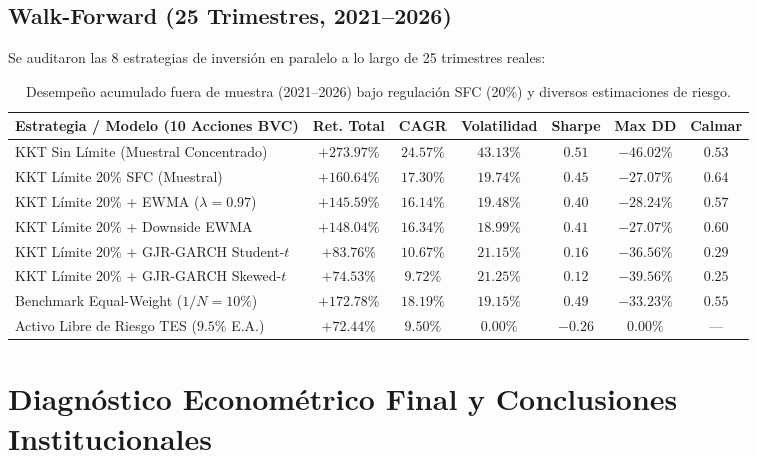 \documentclass[11pt,a4paper]{article}
\begin{document}
\subsection{Walk-Forward (25 Trimestres, 2021--2026)}
Se auditaron las 8 estrategias de inversión en paralelo a lo largo de 25 trimestres reales:

\begin{table}[htbp]
\centering
\footnotesize
\setlength{\tabcolsep}{3pt}
\begin{tabularx}{\textwidth}{Xcccccc}
\toprule
Estrategia / Modelo (10 Acciones BVC) & Ret. Total & CAGR & Volatilidad & Sharpe & Max DD & Calmar \\
\midrule
KKT Sin Límite (Muestral Concentrado) & $+273.97\%$ & $24.57\%$ & $43.13\%$ & $0.51$ & $-46.02\%$ & $0.53$ \\
KKT Límite 20\% SFC (Muestral) & $+160.64\%$ & $17.30\%$ & $19.74\%$ & $0.45$ & $-27.07\%$ & $0.64$ \\
KKT Límite 20\% + EWMA ($\lambda=0.97$) & $+145.59\%$ & $16.14\%$ & $19.48\%$ & $0.40$ & $-28.24\%$ & $0.57$ \\
KKT Límite 20\% + Downside EWMA & $+148.04\%$ & $16.34\%$ & $18.99\%$ & $0.41$ & $-27.07\%$ & $0.60$ \\
KKT Límite 20\% + GJR-GARCH Student-$t$ & $+83.76\%$ & $10.67\%$ & $21.15\%$ & $0.16$ & $-36.56\%$ & $0.29$ \\
KKT Límite 20\% + GJR-GARCH Skewed-$t$ & $+74.53\%$ & $9.72\%$ & $21.25\%$ & $0.12$ & $-39.56\%$ & $0.25$ \\
\midrule
Benchmark Equal-Weight ($1/N = 10\%$) & $+172.78\%$ & $18.19\%$ & $19.15\%$ & $0.49$ & $-33.23\%$ & $0.55$ \\
Activo Libre de Riesgo TES ($9.5\%$ E.A.) & $+72.44\%$ & $9.50\%$ & $0.00\%$ & $-0.26$ & $0.00\%$ & --- \\
\bottomrule
\end{tabularx}
\caption{Desempeño acumulado fuera de muestra (2021--2026) bajo regulación SFC (20\%) y diversos estimaciones de riesgo.}
\end{table}

\section{Diagnóstico Econométrico Final y Conclusiones Institucionales}
\end{document}
